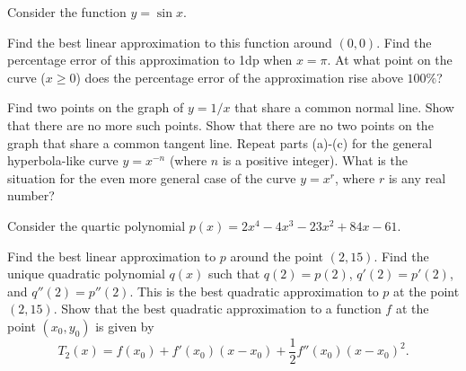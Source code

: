 \begin{questions}
  \question Consider the function $ y = \sin x $.
    \begin{parts}
      \parM Find the best linear approximation to this function around $ (0,0) $.
      \parM Find the percentage error of this approximation to 1dp when $ x = \pi $.
      \parE At what point on the curve ($ x \geq 0 $) does the percentage error of the approximation rise above $ 100\% $?
    \end{parts}
  \question
    \begin{parts}
      \parM Find two points on the graph of $ y = 1/x $ that share a common normal line.
      \parM Show that there are no more such points.
      \parM Show that there are no two points on the graph that share a common tangent line.
      \parE Repeat parts (a)-(c) for the general hyperbola-like curve $ y = x^{-n} $ (where $ n $ is a positive integer).
      \parS What is the situation for the even more general case of the curve $ y = x^r $, where $ r $ is any real number?
    \end{parts}
  \question Consider the quartic polynomial $ p(x) = 2x^4 -4x^3 - 23x^2 + 84x - 61 $.
    \begin{parts}
      \parM Find the best linear approximation to $ p $ around the point $ (2, 15) $.
      \parS Find the unique quadratic polynomial $ q(x) $ such that $ q(2) = p(2) $, $ q'(2) = p'(2) $, and $ q''(2) = p''(2) $.
            This is the best quadratic approximation to $ p $ at the point $ (2, 15) $.
      \parO Show that the best quadratic approximation to a function $ f $ at the point $ (x_0, y_0) $ is given by
            \begin{displaymath}
              T_2(x) = f(x_0) + f'(x_0) (x - x_0) + \frac{1}{2} f''(x_0) (x - x_0)^2.
            \end{displaymath}
    \end{parts}
\end{questions}

